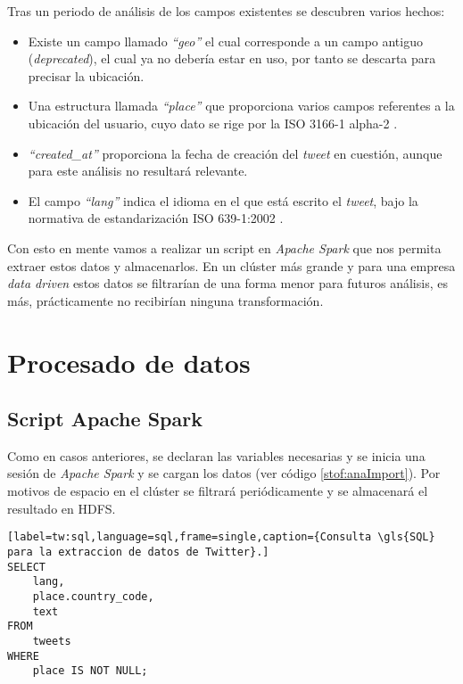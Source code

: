 Tras un periodo de análisis de los campos existentes se descubren varios hechos:
\begin{itemize}
	\item Existe un campo llamado \textit{``geo''} el cual corresponde a un campo antiguo (\textit{deprecated}), el cual ya no debería estar en uso, por tanto se descarta para precisar la ubicación.
	
	\item Una estructura llamada \textit{``place''} que proporciona varios campos referentes a la ubicación del usuario, cuyo dato se rige por la \gls{ISO} 3166-1 alpha-2 \cite{isogeo}.

	\item \textit{``created\_at''} proporciona la fecha de creación del \textit{tweet} en cuestión, aunque para este análisis no resultará relevante.
	
	\item El campo \textit{``lang''} indica el idioma en el que está escrito el \textit{tweet}, bajo la normativa de estandarización \gls{ISO} 639-1:2002 \cite{isolang}.
\end{itemize}

Con esto en mente vamos a realizar un script en \textit{Apache Spark} que nos permita extraer estos datos y almacenarlos. En un clúster más grande y para una empresa \textit{data driven} estos datos se filtrarían de una forma menor para futuros análisis, es más, prácticamente no recibirían ninguna transformación.

\clearpage
\section{Procesado de datos}

\subsection{Script Apache Spark}
Como en casos anteriores, se declaran las variables necesarias y se inicia una sesión de \textit{Apache Spark} y se cargan los datos (ver código \ref{stof:anaImport}). Por motivos de espacio en el clúster se filtrará periódicamente y se almacenará el resultado en \gls{HDFS}.
\begin{lstlisting}[label=tw:sql,language=sql,frame=single,caption={Consulta \gls{SQL} para la extraccion de datos de Twitter}.]
SELECT 
	lang,
	place.country_code,
	text
FROM
	tweets
WHERE
	place IS NOT NULL;
\end{lstlisting}

